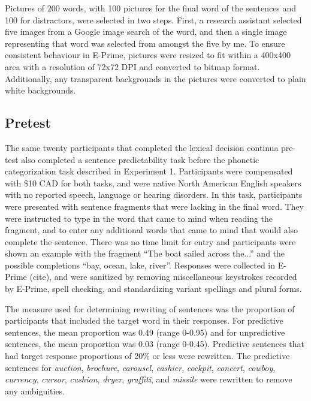 Pictures of 200 words, with 100 pictures for the final word of the sentences and 100 for distractors, were selected in two steps.  
First, a research assistant selected five images from a Google image search of the word, and then a single image representing that word was selected from amongst the five by me.  
To ensure consistent behaviour in E-Prime, pictures were resized to fit within a 400x400 area with a resolution of 72x72 DPI and converted to bitmap format.  
Additionally, any transparent backgrounds in the pictures were converted to plain white backgrounds.

\subsection{Pretest}

The same twenty participants that completed the lexical decision continua pre-test also completed a sentence predictability task before the phonetic categorization task described in Experiment 1. 
Participants were compensated with \$10 CAD for both tasks, and were native North American English speakers with no reported speech, language or hearing disorders. In this task, participants were presented with sentence fragments that were lacking in the final word.  
They were instructed to type in the word that came to mind when reading the fragment, and to enter any additional words that came to mind that would also complete the sentence.  
There was no time limit for entry and participants were shown an example with the fragment ``The boat sailed across the...'' and the possible completions ``bay, ocean, lake, river''.  
Responses were collected in E-Prime (cite), and were sanitized by removing miscellaneous keystrokes recorded by E-Prime, spell checking, and standardizing variant spellings and plural forms.

The measure used for determining rewriting of sentences was the proportion of participants that included the target word in their responses.  
For predictive sentences, the mean proportion was 0.49 (range 0-0.95) and for unpredictive sentences, the mean proportion was 0.03 (range 0-0.45).  
Predictive sentences that had target response proportions of 20\% or less were rewritten.  
The predictive sentences for \emph{auction}, \emph{brochure}, \emph{carousel}, \emph{cashier}, \emph{cockpit}, \emph{concert}, \emph{cowboy}, \emph{currency}, \emph{cursor}, \emph{cushion}, \emph{dryer}, \emph{graffiti}, and \emph{missile} were rewritten to remove any ambiguities.  

